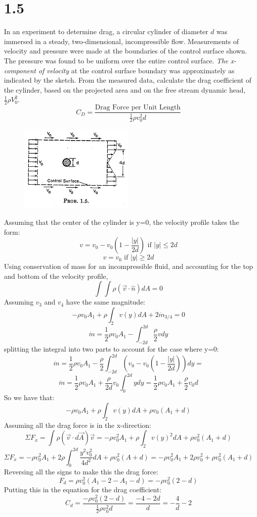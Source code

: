 \documentclass[preview,12pt]{article}
\begin{document}
\section*{1.5}
    In an experiment to determine drag, a circular cylinder of diameter $d$ was immersed in a steady, two-dimensional, incompressible flow.  Measurements of velocity and pressure were made at the boundaries of the control surface shown.  The pressure was found to be uniform over the entire control surface.  \textit{The x-component of velocity} at the control surface boundary was approximately as indicated by the sketch.  From the measured data, calculate the drag coefficient of the cylinder, based on the projected area and on the free stream dynamic head, $\frac{1}{2}\rho V_0^2$.
    $$C_D=\frac{\textrm{Drag Force per Unit Length}}{\frac{1}{2}\rho v_0^2d}$$
    \begin{figure}
        \includegraphics[width=0.5\textwidth]{HW1_5.PNG}
        \centering
    \end{figure}
    $$$$
    Assuming that the center of the cylinder is y=0, the velocity profile takes the form: 
    $$v=v_0-v_0(1-\frac{|y|}{2d}) \textrm{ if }|y|\leq2d$$
    $$v=v_0 \textrm{ if     } |y|\geq2d$$
    Using conservation of mass for an incompressible fluid, and accounting for the top and bottom of the velocity profile, 
    $$\int\int\rho (\vec{v}\cdot\hat{n})dA=0$$
    Assuming $v_3$ and $v_4$ have the same magnitude:
    $$-\rho v_0 A_1+\rho \int_2 v(y)dA+2\dot{m}_{3/4}=0$$
    $$\dot{m}=\frac{1}{2}\rho v_0 A_1-\int_{-2d}^{2d}\frac{\rho}{2}vdy$$
    splitting the integral into two parts to account for the case where y=0:
    $$\dot{m}=\frac{1}{2}\rho v_0 A_1-\frac{\rho}{2}\int_{-2d}^{2d}(v_0-v_0(1-\frac{|y|}{2d}))dy=$$
    $$\dot{m}=\frac{1}{2}\rho v_0 A_1+\frac{\rho}{2d}v_0\int_{0}^{2d}ydy=\frac{1}{2}\rho v_0 A_1+\frac{\rho}{2}v_0d$$
    So we have that:
    $$-\rho v_0 A_1+\rho\int_2v(y)dA+\rho v_0(A_1+d)$$ 
    Assuming all the drag force is in the x-direction:
    $$\Sigma F_x=\int\rho(\vec{v}\cdot d\vec{A})\vec{v}=-\rho v_0^2A_1+\rho\int_2v(y)^2dA+\rho v_0^2(A_1+d)$$
    $$\Sigma F_x=-\rho v_0^2A_1+2\rho\int_0^{2d}\frac{y^2v_0^2}{4d^2}dA+\rho v_0^2(A+d)=-\rho v_0^2A_1+2\rho v_0^2+\rho v_0^2(A_1+d)$$
    Reversing all the signs to make this the drag force:
    $$F_d=\rho v_0^2(A_1-2-A_1-d)=-\rho v_0^2(2-d)$$
    Putting this in the equation for the drag coefficient:
    $$C_d=\frac{-\rho v_0^2(2-d)}{\frac{1}{2}\rho v_0^2d}=\frac{-4-2d}{d}=-\frac{4}{d}-2$$
\end{document}
